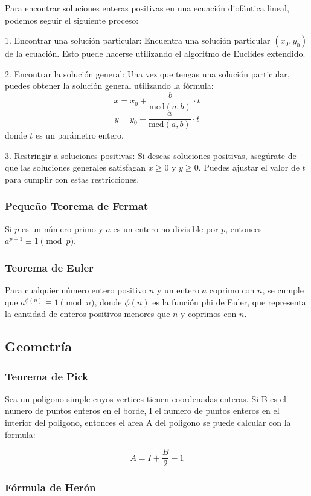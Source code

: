 Para encontrar soluciones enteras positivas en una ecuación diofántica lineal, podemos seguir el siguiente proceso:

1. Encontrar una solución particular: Encuentra una solución particular $(x_0, y_0)$ de la ecuación. Esto puede hacerse utilizando el algoritmo de Euclides extendido.

2. Encontrar la solución general: Una vez que tengas una solución particular, puedes obtener la solución general utilizando la fórmula:
\[ x = x_0 + \frac{b}{\text{mcd}(a, b)} \cdot t \]
\[ y = y_0 - \frac{a}{\text{mcd}(a, b)} \cdot t \]
donde $t$ es un parámetro entero.

3. Restringir a soluciones positivas: Si deseas soluciones positivas, asegúrate de que las soluciones generales satisfagan $x \geq 0$ y $y \geq 0$. Puedes ajustar el valor de $t$ para cumplir con estas restricciones.

\subsubsection{Pequeño Teorema de Fermat}
Si $p$ es un número primo y $a$ es un entero no divisible por $p$, entonces $a^{p-1} \equiv 1 \pmod{p}$.

\subsubsection{Teorema de Euler}
Para cualquier número entero positivo $n$ y un entero $a$ coprimo con $n$, se cumple que $a^{\phi(n)} \equiv 1 \pmod{n}$, donde $\phi(n)$ es la función phi de Euler, que representa la cantidad de enteros positivos menores que $n$ y coprimos con $n$.

\subsection{Geometría}

\subsubsection{Teorema de Pick}

Sea un poligono simple cuyos vertices tienen coordenadas enteras. Si B es el numero de puntos enteros en el borde, I el numero de puntos enteros en el interior del poligono, entonces el area A del poligono se puede calcular con la formula:

\[ A = I + \frac{B}{2} - 1 \]

\subsubsection{Fórmula de Herón}

